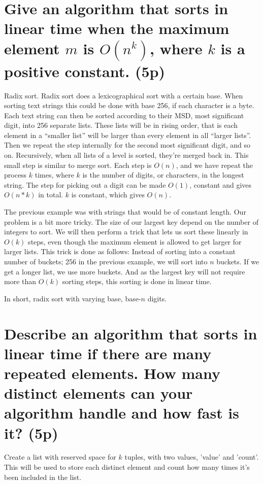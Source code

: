 \documentclass[a4paper,10pt,titlepage]{article}
\begin{document}
\section {Give an algorithm that sorts in linear time when the maximum element $m$ is $O(n^k)$, where $k$ is a positive constant. (5p)}

Radix sort. Radix sort does a lexicographical sort with a certain base. When sorting text strings this could be done with base 256, if each character is a byte. Each text string can then be sorted according to their MSD, most significant digit, into 256 separate lists. These lists will be in rising order, that is each element in a ``smaller list'' will be larger than every element in all ``larger lists''. Then we repeat the step internally for the second most significant digit, and so on. Recursively, when all lists of a level is sorted, they're merged back in. This small step is similar to merge sort. Each step is $O(n)$, and we have repeat the process $k$ times, where $k$ is the number of digits, or characters, in the longest string. The step for picking out a digit can be made $O(1)$, constant and gives $O(n*k)$ in total. $k$ is constant, which gives $O(n)$.

The previous example was with strings that would be of constant length. Our problem is a bit more tricky. The size of our largest key depend on the number of integers to sort. We will then perform a trick that lets us sort these linearly in $O(k)$ steps, even though the maximum element is allowed to get larger for larger lists. This trick is done as follows: Instead of sorting into a constant number of buckets; 256 in the previous example, we will sort into $n$ buckets. If we get a longer list, we use more buckets. And as the largest key will not require more than $O(k)$ sorting steps, this sorting is done in linear time.

In short, radix sort with varying base, base-$n$ digits.

\section {Describe an algorithm that sorts in linear time if there are many repeated elements. How many distinct elements can your algorithm handle and how fast is it? (5p)}

Create a list with reserved space for $k$ tuples, with two values, 'value' and 'count'. This will be used to store each distinct element and count how many times it's been included in the list.
\end{document}
